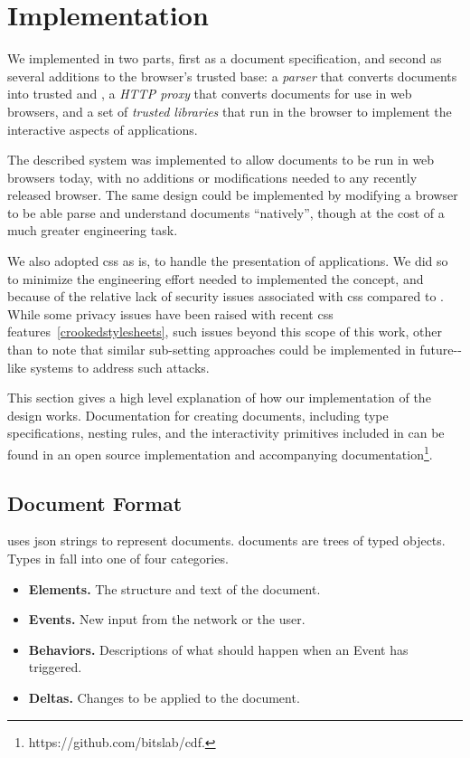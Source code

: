 \section{Implementation}
\label{future-web:implementation}

We implemented \CDF in two parts, first as a document specification, and second
as several additions to the browser's trusted base: a \emph{parser} that
converts \CDF documents into trusted \HTML and \JS, a \emph{HTTP proxy} that
converts \CDF documents for use in web browsers, and a set of \emph{trusted \JS
libraries} that run in the browser to implement the interactive aspects of \CDF
applications.

The described system was implemented to allow \CDF documents to be run in web
browsers today, with no additions or modifications needed to any recently
released browser.  The same design could be implemented by modifying a browser
to be able parse and understand \CDF documents ``natively'', though at the cost
of a much greater engineering task.

We also adopted \gls{css} as is, to handle the presentation
of \CDF applications.  We did so to minimize the engineering effort needed
to implemented the \CDF concept, and because of the relative lack of security
issues associated with \gls{css} compared to \JS.  While some privacy issues
have been raised with recent \gls{css} features~\ref{crookedstylesheets},
such issues beyond this scope of this work, other than to note
that similar sub-setting approaches could be implemented in future-\CDF-like
systems to address such attacks.

This section gives a high level explanation of how our implementation
of the \CDF design works.  Documentation for creating \CDF documents, including
type specifications, nesting rules, and the interactivity primitives
included in \CDF can be found in an open source implementation and accompanying
documentation\footnote{https://github.com/bitslab/cdf.}.

\subsection{Document Format}
\CDF uses \gls{json} strings to represent documents.  \CDF documents are
trees of typed objects.  Types in \CDF fall into one of four categories.

\begin{itemize}[itemsep=-2pt]
  \item \textbf{Elements.} The structure and text of the document.
  \item \textbf{Events.} New input from the network or the user.
  \item \textbf{Behaviors.} Descriptions of what should happen when an Event has
                   triggered.
  \item \textbf{Deltas.} Changes to be applied to the document.
\end{itemize}

